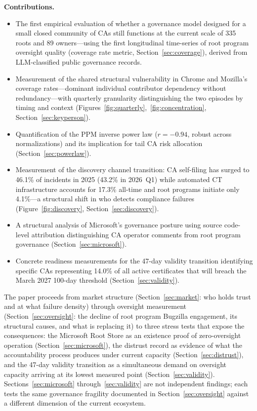 \documentclass[10pt,twocolumn,letterpaper]{article}
\begin{document}
\textbf{Contributions.}
\begin{itemize}[noitemsep,topsep=2pt]
\item The first empirical evaluation of whether a governance model designed
  for a small closed community of CAs still functions at the current scale
  of 335 roots and 89 owners---using the first longitudinal time-series of
  root program oversight quality (coverage rate metric,
  Section~\ref{sec:coverage}), derived from LLM-classified public governance
  records.
\item Measurement of the shared structural vulnerability in Chrome and
  Mozilla's coverage rates---dominant individual contributor dependency
  without redundancy---with quarterly granularity distinguishing the two
  episodes by timing and context
  (Figures~\ref{fig:quarterly},~\ref{fig:concentration}, Section~\ref{sec:keyperson}).
\item Quantification of the PPM inverse power law ($r=-0.94$, robust across
  normalizations) and its implication for tail CA risk allocation
  (Section~\ref{sec:powerlaw}).
\item Measurement of the discovery channel transition: CA self-filing
  has surged to 46.1\% of incidents in 2025 (43.2\% in 2026~Q1) while
  automated CT infrastructure accounts for 17.3\% all-time and root
  programs initiate only 4.1\%---a structural shift in who detects
  compliance failures (Figure~\ref{fig:discovery}, Section~\ref{sec:discovery}).
\item A structural analysis of Microsoft's governance posture using
  source code-level attribution distinguishing CA operator comments from
  root program governance (Section~\ref{sec:microsoft}).
\item Concrete readiness measurements for the 47-day validity transition
  identifying specific CAs representing 14.0\% of all active certificates
  that will breach the March 2027 100-day threshold (Section~\ref{sec:validity}).
\end{itemize}

The paper proceeds from market structure (Section~\ref{sec:market}: who
holds trust and at what failure density) through oversight measurement
(Section~\ref{sec:oversight}: the decline of root program Bugzilla
engagement, its structural causes, and what is replacing it) to three
stress tests that expose the consequences: the Microsoft Root Store as an
existence proof of zero-oversight operation (Section~\ref{sec:microsoft}),
the distrust record as evidence of what the accountability process produces
under current capacity (Section~\ref{sec:distrust}), and the 47-day
validity transition as a simultaneous demand on oversight capacity arriving
at its lowest measured point (Section~\ref{sec:validity}).
Sections~\ref{sec:microsoft} through~\ref{sec:validity} are not independent
findings; each tests the same governance fragility documented in
Section~\ref{sec:oversight} against a different dimension of the current
ecosystem.
\end{document}
